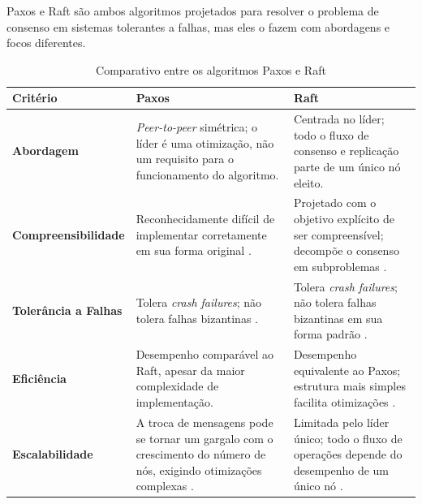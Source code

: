         Paxos e Raft são ambos algoritmos projetados para resolver o problema de consenso em sistemas tolerantes a falhas, mas eles o fazem com abordagens e focos diferentes.

        \begin{table}[htb]
            \ABNTEXfontereduzida
            \centering
            \begin{tabular}{|>{\raggedright\arraybackslash}p{4.2cm}|>{\raggedright\arraybackslash}p{5.1cm}|>{\raggedright\arraybackslash}p{5.1cm}|}
                \hline
                \textbf{Critério} & \textbf{Paxos} & \textbf{Raft} \\
                \hline
                \textbf{Abordagem} &
                    \textit{Peer-to-peer} simétrica; o líder é uma otimização, não um requisito para o funcionamento do algoritmo. &
                    Centrada no líder; todo o fluxo de consenso e replicação parte de um único nó eleito. \\
                \hline
                \textbf{Compreensibilidade} &
                    Reconhecidamente difícil de implementar corretamente em sua forma original \cite{raft2014}. &
                    Projetado com o objetivo explícito de ser compreensível; decompõe o consenso em subproblemas \cite{raft2014}. \\
                \hline
                \textbf{Tolerância a Falhas} &
                    Tolera \textit{crash failures}; não tolera falhas bizantinas \cite{lamport2001paxos}. &
                    Tolera \textit{crash failures}; não tolera falhas bizantinas em sua forma padrão \cite{raft2014}. \\
                \hline
                \textbf{Eficiência} &
                    Desempenho comparável ao Raft, apesar da maior complexidade de implementação. &
                    Desempenho equivalente ao Paxos; estrutura mais simples facilita otimizações \cite{raft2014}. \\
                \hline
                \textbf{Escalabilidade} &
                    A troca de mensagens pode se tornar um gargalo com o crescimento do número de nós, exigindo otimizações complexas \cite{ailijiang2019consensus}. &
                    Limitada pelo líder único; todo o fluxo de operações depende do desempenho de um único nó \cite{raft2014}. \\
                \hline
            \end{tabular}
            \caption{Comparativo entre os algoritmos Paxos e Raft}
            \label{table:paxos-raft}
        \end{table}

